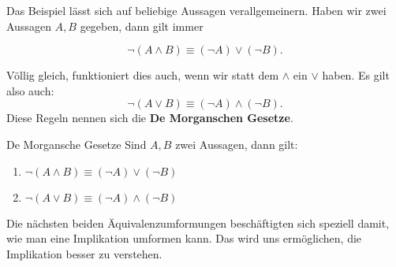 \documentclass[../../main.tex]{subfiles}
\begin{document}
     Das Beispiel lässt sich auf beliebige Aussagen verallgemeinern. 
     Haben wir zwei Aussagen $A,B$ gegeben, dann gilt immer
     
     \[\lnot( A \land B) \equiv (\lnot A) \lor (\lnot B).\]
     
     Völlig gleich, funktioniert dies auch, wenn wir 
     statt dem $\land$ ein $\lor$ haben. Es gilt also auch:
     \[\lnot( A \lor B) \equiv (\lnot A) \land (\lnot B).\]
     Diese Regeln nennen sich die \textbf{De Morganschen Gesetze}.
     
    \begin{theorem}{De Morgansche Gesetze}
        Sind $A,B$ zwei Aussagen, dann gilt:
        \begin{enumerate}
            \item $\lnot( A \land B) \equiv (\lnot A) \lor (\lnot B)$
            \item $\lnot( A \lor B) \equiv (\lnot A) \land (\lnot B)$
        \end{enumerate}
    \end{theorem}
    
    Die nächsten beiden Äquivalenzumformungen beschäftigten sich speziell damit, wie 
    man eine Implikation umformen kann. Das wird uns ermöglichen,
    die Implikation besser zu verstehen.
    
\end{document}
